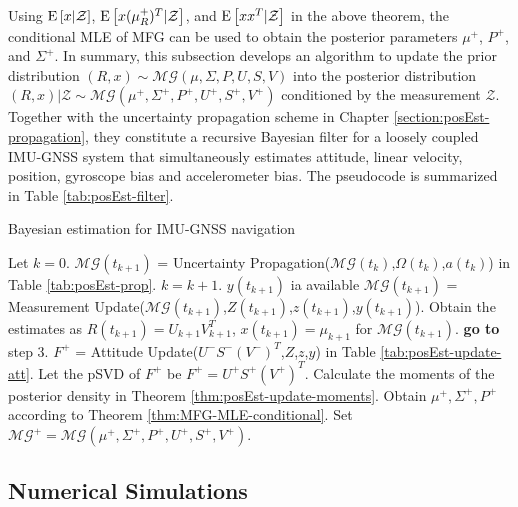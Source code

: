 Using $\mathrm{E}\left[ x|\mathcal{Z} \right]$, $\mathrm{E}\left[ x(\mu_R^+)^T|\mathcal{Z} \right]$, and $\mathrm{E}\left[ xx^T|\mathcal{Z} \right]$ in the above theorem, the conditional MLE of MFG can be used to obtain the posterior parameters $\mu^+$, $P^+$, and $\Sigma^+$.
In summary, this subsection develops an algorithm to update the prior distribution $(R,x) \sim \mathcal{MG}(\mu,\allowbreak \Sigma,\allowbreak P,\allowbreak U,\allowbreak S,\allowbreak V)$ into the posterior distribution $(R,x)|\mathcal{Z} \sim \mathcal{MG}(\mu^+,\allowbreak \Sigma^+,\allowbreak P^+,\allowbreak U^+,\allowbreak S^+,\allowbreak V^+)$ conditioned by the measurement $\mathcal{Z}$.
Together with the uncertainty propagation scheme in Chapter \ref{section:posEst-propagation}, they constitute a recursive Bayesian filter for a loosely coupled IMU-GNSS system that simultaneously estimates attitude, linear velocity, position, gyroscope bias and accelerometer bias.
The pseudocode is summarized in Table \ref{tab:posEst-filter}.

\begin{table}
	\caption{Bayesian estimation for IMU-GNSS navigation \label{tab:posEst-filter}}
	\begin{algorithmic}[1]
		\algrule[0.8pt]
		\algrule
		\State Let $k=0$.
		\Repeat
		\State $\mathcal{MG}(t_{k+1})$ = Uncertainty Propagation($\mathcal{MG}(t_k)$,$\Omega(t_k)$,$a(t_k)$) in Table \ref{tab:posEst-prop}.
		\State $k=k+1$.
		\Until $y(t_{k+1})$ ia available
		\State $\mathcal{MG}(t_{k+1})$ = Measurement Update($\mathcal{MG}(t_{k+1})$,$Z(t_{k+1})$,$z(t_{k+1})$,$y(t_{k+1})$).
		\State Obtain the estimates as $R(t_{k+1})=U_{k+1}V_{k+1}^T$, $x(t_{k+1})=\mu_{k+1}$ for $\mathcal{MG}(t_{k+1})$.
		\State \textbf{go to} step 3.
		\EndProcedure
		\algrule
		\State $F^+$ = Attitude Update($U^-S^-(V^-)^T$,$Z$,$z$,$y$) in Table \ref{tab:posEst-update-att}.
		\State Let the pSVD of $F^+$ be $F^+ = U^+S^+(V^+)^T$.
		\State Calculate the moments of the posterior density in Theorem \ref{thm:posEst-update-moments}.
		\State Obtain $\mu^+,\Sigma^+,P^+$ according to Theorem \ref{thm:MFG-MLE-conditional}.
		\State Set $\mathcal{MG}^+ = \mathcal{MG}(\mu^+,\Sigma^+,P^+,U^+,S^+,V^+)$.
		\EndProcedure
		\algrule[0.8pt]
	\end{algorithmic}
\end{table}

\subsection{Numerical Simulations}

